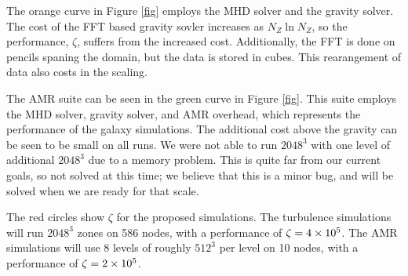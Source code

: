 The orange curve in Figure \ref{fig} employs the MHD solver and the gravity
solver.  The cost of the FFT based gravity sovler increases as $N_Z \ln N_Z$, so the
performance, $\zeta$, suffers from the increased cost.  Additionally, the FFT is
done on pencils spaning the domain, but the data is stored in cubes.  This
rearangement of data also costs in the scaling.  

The AMR suite can be seen in the green curve in Figure \ref{fig}.  This suite
employs the MHD solver, gravity solver, and AMR overhead, which represents the
performance of the galaxy simulations.  The additional cost above the gravity can be
seen to be small on all runs.  
We were not able to run $2048^3$ with one level of
additional $2048^3$ due to a memory problem.
This is quite far from our current goals, so not solved at this time; we believe
that this is a minor bug, and will be solved when we are ready for that scale.

The red circles show $\zeta$ for the proposed simulations.  The turbulence
simulations will run $2048^3$ zones on 586 nodes, with a performance of
$\zeta=4\times {10^{5}}$.  
The AMR simulations will use 8 levels of roughly $512^3$ per level on 10 nodes,
with a performance of $\zeta=2\times {10^{5}}$.  





